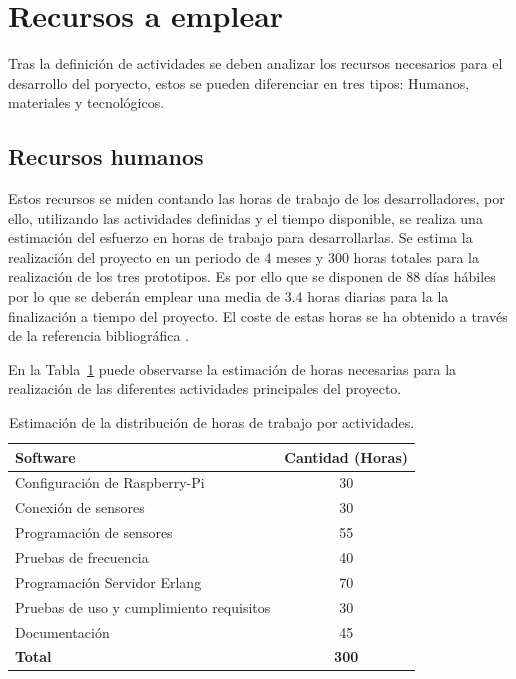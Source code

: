 \clearpage
\section{Recursos a emplear}

Tras la definición de actividades se deben analizar los recursos necesarios para el desarrollo del poryecto, estos se pueden diferenciar en tres tipos: Humanos, materiales y tecnológicos.

\subsection{Recursos humanos}%
\label{sec:recHumanos}

Estos recursos se miden contando las horas de trabajo de los desarrolladores, por ello, utilizando las actividades definidas y el tiempo disponible, se realiza una estimación del esfuerzo en horas de trabajo para desarrollarlas. Se estima la realización del proyecto en un periodo de 4 meses y 300 horas totales para la realización de los tres prototipos. Es por ello que se disponen de 88 días hábiles por lo que se deberán emplear una media de 3.4 horas diarias para la la finalización a tiempo del proyecto. 
El coste de estas horas se ha obtenido a través de la referencia bibliográfica \cite{Cowork2023}.

En la Tabla~\ref{tab:costSoft} puede observarse la estimación de horas necesarias para la realización de las diferentes actividades principales del proyecto.

\begin{table}[h]
\begin{center}
\begin{tabular}{|l|c|}
\hline
\rowcolor{gray!20}
\textbf{Software} & \textbf{Cantidad (Horas)} \\
\hline
Configuración de Raspberry-Pi & 30 \\
\hline
Conexión de sensores & 30\\
\hline
Programación de sensores & 55\\
\hline
Pruebas de frecuencia & 40 \\
\hline
Programación Servidor Erlang & 70\\
\hline
Pruebas de uso y cumplimiento requisitos & 30 \\
\hline
Documentación & 45 \\
\hline
\rowcolor{gray!20}
\textbf{Total} & \textbf{300}\\
\hline
\end{tabular}
\caption[Estimación de horas de trabajo]{Estimación de la distribución de horas de trabajo por actividades.}%
\label{tab:costSoft}
\end{center}
\end{table}

